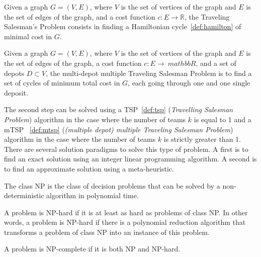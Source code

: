 \documentclass[english,RandD]{rapportPFE}  %
\begin{document}
				\begin{Definition}
					\label{def:tsp}
					Given a graph $G = (V, E)$, where $V$ is the set of vertices of the graph and $E$ is the set of edges of the graph, and a cost function $c : E \rightarrow \mathbb{R}$, the Traveling Salesman's Problem consists in finding a Hamiltonian cycle~\ref{def:hamilton} of minimal cost in $G$.
				\end{Definition}

				\begin{Definition}
					\label{def:mtsp}
					Given a graph $G = (V, E)$, where $V$ is the set of vertices of the graph and $E$ is the set of edges of the graph, a cost function $c : E \rightarrow \ mathbb{R}$, and a set of depots $D \subset V$, the multi-depot multiple Traveling Salesman Problem is to find a set of cycles of minimum total cost in $G$, each going through one and one single deposit.
				\end{Definition}

				The second step can be solved using a TSP~\ref{def:tsp} (\textit{Travelling Salesman Problem}) algorithm in the case where the number of teams $k$ is equal to 1 and a mTSP ~\ref{def:mtsp} (\textit{(multiple depot) multiple Traveling Salesman Problem}) algorithm in the case where the number of teams $k$ is strictly greater than 1.
				There are several solution paradigms to solve this type of problem.
				A first is to find an exact solution using an integer linear programming algorithm.
				A second is to find an approximate solution using a meta-heuristic.

				\begin{Definition}[NP Class]
					\label{def:np}
					The class NP is the class of decision problems that can be solved by a non-deterministic algorithm in polynomial time.
				\end{Definition}

				\begin{Definition}
					\label{def:nph}
					A problem is NP-hard if it is at least as hard as problems of class NP.
					In other words, a problem is NP-hard if there is a polynomial reduction algorithm that transforms a problem of class NP into an instance of this problem.
				\end{Definition}

				\begin{Definition}
					\label{def:npc}
					A problem is NP-complete if it is both NP and NP-hard.
				\end{Definition}
\end{document}
